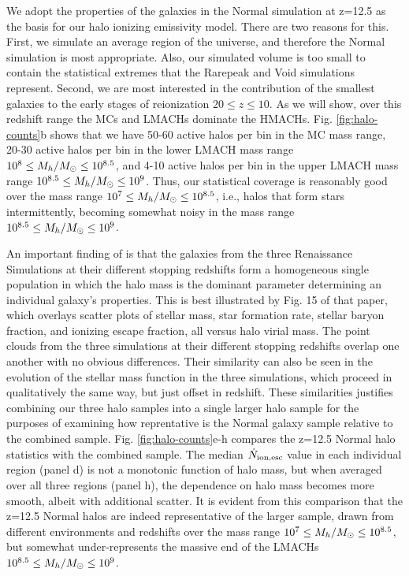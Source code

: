 \documentclass[iop,apj]{emulateapj}
\begin{document}
We adopt the properties of the galaxies in the Normal simulation at z=12.5 as the basis for our halo ionizing emissivity model.  There are two reasons for this. First, we simulate an average region of the universe, and therefore the Normal simulation is most appropriate. Also, our simulated volume is too small to contain the statistical extremes that the Rarepeak and Void simulations represent. Second, we are most interested in the contribution of the smallest galaxies to the early stages of reionization $20 \leq z \leq 10$. As we will show, over this redshift range the MCs and LMACHs dominate the HMACHs. Fig. \ref{fig:halo-counts}b shows that we have 50-60 active halos per bin in the MC mass range, 20-30 active halos per bin in the lower LMACH mass range   $10^8 \leq \mh/\Ms \leq 10^{8.5}$, and 4-10 active halos per bin in the upper LMACH mass range   $10^{8.5} \leq \mh/\Ms \leq 10^{9}$. Thus, our statistical coverage is reasonably good over the mass range  $10^7 \leq \mh/\Ms \leq 10^{8.5}$, i.e., halos that form stars intermittently, becoming somewhat noisy in the mass range  $10^{8.5} \leq \mh/\Ms \leq 10^{9}$. 

An important finding of \cite{Xu16} is that the galaxies from the three Renaissance Simulations at their different stopping redshifts form a homogeneous single population in which the halo mass is the dominant parameter determining an individual galaxy's properties. This is best illustrated by Fig. 15 of that paper, which overlays scatter plots of stellar mass, star formation rate, stellar baryon fraction, and ionizing escape fraction, all versus halo virial mass. The point clouds from the three simulations at their different stopping redshifts overlap one another with no obvious differences. Their similarity can also be seen in the evolution of the stellar mass function in the three simulations, which proceed in qualitatively the same way, but just offset in redshift. These similarities justifies combining our three halo samples into a single larger halo sample for the purposes of examining how reprentative is the Normal galaxy sample relative to the combined sample. Fig. \ref{fig:halo-counts}e-h compares the z=12.5 Normal halo statistics with the combined sample. The median $\dot{N}_{\rm ion,esc}$ value in each individual region (panel d) is not a monotonic function of halo mass, but when averaged over all three regions (panel h), the dependence on halo mass becomes more smooth, albeit with additional scatter.  It is evident from this comparison that the z=12.5 Normal halos are indeed representative of the larger sample, drawn from different environments and redshifts over the mass range $10^7 \leq \mh/\Ms \leq 10^{8.5}$, but somewhat under-represents the massive end of the LMACHs $10^{8.5} \leq \mh/\Ms \leq 10^{9}$. 
\end{document}
